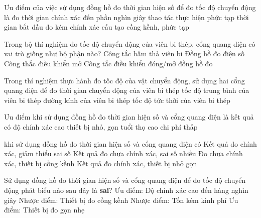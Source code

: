 \begin{ex}%
Ưu điểm của việc sử dụng đồng hồ đo thời gian hiện số để đo tốc độ chuyển động là
\choice
{\True đo thời gian chính xác đến phần nghìn giây}
{thao tác thực hiện phức tạp}
{thời gian bắt đầu đo kém chính xác}
{cấu tạo cồng kềnh, phức tạp}

\loigiai{
}
 \end{ex}
\begin{ex}%
Trong bộ thí nghiệm đo tốc độ chuyển động của viên bi thép, cổng quang điện có vai trò giống như bộ phận nào?
\choice
{Công tắc bấm thả viên bi}
{Đồng hồ đo điện số}
{Công thắc điều khiển mở}
{\True Công tắc điều khiển đóng/mở đồng hồ đo}

\loigiai{
}
 \end{ex}
\begin{ex}%
Trong thí nghiệm thực hành đo tốc độ của vật chuyển động, sử dụng hai cổng quang điện để đo
\choice
{\True thời gian chuyển động của viên bi thép}
{tốc độ trung bình của viên bi thép}
{đường kính của viên bi thép}
{tốc độ tức thời của viên bi thép}

\loigiai{
}
 \end{ex}
\begin{ex}%
Ưu điểm khi sử dụng đồng hồ đo thời gian hiện số và cổng quang điện là
\choice
{\True kết quả có độ chính xác cao}
{thiết bị nhỏ, gọn}
{tuổi thọ cao}
{chi phí thấp}

\loigiai{
}
 \end{ex}
\begin{ex}%
khi sử dụng đồng hồ đo thời gian hiện số và cổng quang điện có
\choice
{\True Kết quả đo chính xác, giảm thiểu sai số}
{Kết quả đo chưa chính xác, sai số nhiều}
{Đo chưa chính xác, thiết bị cồng kềnh}
{Kết quả đo chính xác, thiết bị nhỏ gọn}

\loigiai{
}
 \end{ex}
\begin{ex}%
Sử dụng đồng hồ đo thời gian hiện số và cổng quang điện để đo tốc độ chuyển động phát biểu nào sau đây là \textbf{sai}?
\choice
{Ưu điểm: Độ chính xác cao đến hàng nghìn giây}
{Nhược điểm: Thiết bị đo cồng kềnh}
{Nhược điểm: Tốn kém kinh phí}
{\True Ưu điểm: Thiết bị đo gọn nhẹ}
\loigiai{

}
 \end{ex}

